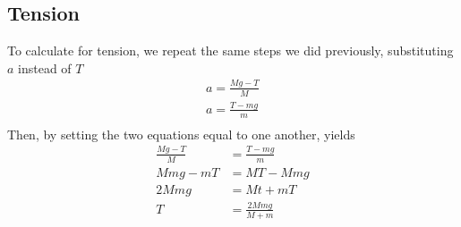 \documentclass[11pt]{article}
\begin{document}
\subsection{Tension}

To calculate for tension, we repeat the same steps we did previously, substituting $a$ instead of $T$
\begin{align*}
    a = \frac{Mg - T}{M} \\
    a = \frac{T - mg}{m} \\
\end{align*}
Then, by setting the two equations equal to one another, yields
\begin{align*}
    \frac{Mg - T}{M} &= \frac{T - mg}{m}\\
    Mmg - mT &= MT - Mmg \\
    2Mmg &= Mt + mT \\
    T &= \frac{2Mmg}{M + m} \\
\end{align*}
\end{document}
